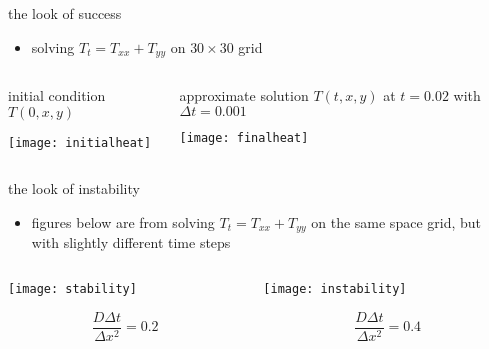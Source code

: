 \begin{frame}{the look of success}

\begin{itemize}
\item solving $T_t = T_{xx} + T_{yy}$ on $30\times 30$ grid
\end{itemize}

\bigskip
\begin{columns}
\begin{column}{0.5\textwidth}
initial condition $T(0,x,y)$

\phantom{foo}

\bigskip
\begin{center}
\texttt{[image: initialheat]}
\end{center}
\end{column}
\begin{column}{0.5\textwidth}
approximate solution $T(t,x,y)$ at $t=0.02$ with $\Delta t=0.001$ 

\bigskip
\begin{center}
\texttt{[image: finalheat]}
\end{center}
\end{column}
\end{columns}
\end{frame}


\begin{frame}{the look of instability}

\begin{itemize}
\item figures below are from solving $T_t = T_{xx} + T_{yy}$ on the same space grid, but with slightly different time steps
\end{itemize}

\bigskip\bigskip
\begin{columns}
\begin{column}{0.5\textwidth}
\begin{center}
\texttt{[image: stability]}

$$\frac{D\Delta t}{\Delta x^2}= 0.2$$
\end{center}
\end{column}
\begin{column}{0.5\textwidth}
\begin{center}
\texttt{[image: instability]}

$$\frac{D\Delta t}{\Delta x^2}= 0.4$$
\end{center}
\end{column}
\end{columns}
\end{frame}


